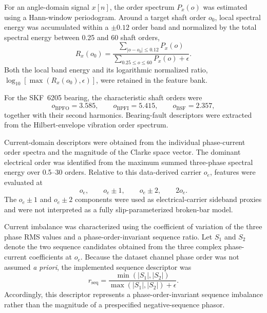 For an angle-domain signal $x[n]$, the order spectrum $P_x(o)$ was
estimated using a Hann-window periodogram. Around a target shaft order
$o_0$, local spectral energy was accumulated within a $\pm 0.12$ order band
and normalized by the total spectral energy between 0.25 and 60 shaft
orders,
\begin{equation}
R_x(o_0) =
\frac{\displaystyle\sum_{|o-o_0| \le 0.12} P_x(o)}
     {\displaystyle\sum_{0.25 \le o \le 60} P_x(o) + \epsilon}.
\label{eq:orderratio}
\end{equation}
Both the local band energy and its logarithmic normalized ratio,
$\log_{10}\!\left[\max\left(R_x(o_0), \epsilon\right)\right]$, were
retained in the feature bank.

For the SKF~6205 bearing, the characteristic shaft orders were
\begin{equation}
o_{\mathrm{BPFO}} = 3.585, \qquad
o_{\mathrm{BPFI}} = 5.415, \qquad
o_{\mathrm{BSF}} = 2.357,
\label{eq:orders}
\end{equation}
together with their second harmonics. Bearing-fault descriptors were
extracted from the Hilbert-envelope vibration order spectrum.

Current-domain descriptors were obtained from the individual phase-current
order spectra and the magnitude of the Clarke space vector. The dominant
electrical order was identified from the maximum summed three-phase
spectral energy over 0.5--30 orders. Relative to this data-derived carrier
$o_e$, features were evaluated at
\begin{equation}
o_e, \qquad o_e \pm 1, \qquad o_e \pm 2, \qquad 2 o_e.
\label{eq:sidebands}
\end{equation}
The $o_e \pm 1$ and $o_e \pm 2$ components were used as electrical-carrier
sideband proxies and were not interpreted as a fully slip-parameterized
broken-bar model.

Current imbalance was characterized using the coefficient of variation of
the three phase RMS values and a phase-order-invariant sequence ratio. Let
$S_1$ and $S_2$ denote the two sequence candidates obtained from the three
complex phase-current coefficients at $o_e$. Because the dataset channel
phase order was not assumed \emph{a priori}, the implemented sequence
descriptor was
\begin{equation}
r_{\mathrm{seq}} =
\frac{\min\left(|S_1|, |S_2|\right)}
     {\max\left(|S_1|, |S_2|\right) + \epsilon}.
\label{eq:seqratio}
\end{equation}
Accordingly, this descriptor represents a phase-order-invariant sequence
imbalance rather than the magnitude of a prespecified negative-sequence
phasor.


